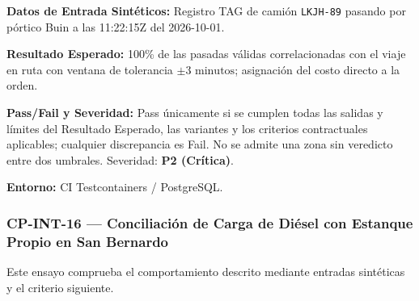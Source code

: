 \par\noindent\textbf{Datos de Entrada Sintéticos:} Registro TAG de camión \texttt{L\allowbreak{}K\allowbreak{}J\allowbreak{}H\allowbreak{}-\allowbreak{}8\allowbreak{}9\allowbreak{}} pasando por pórtico Buin a las 11:22:15Z del 2026-10-01.\par
\par\noindent\textbf{Resultado Esperado:} 100\% de las pasadas válidas correlacionadas con el viaje en ruta con ventana de tolerancia \(\pm 3\text{ minutos}\); asignación del costo directo a la orden.\par
\par\noindent\textbf{Pass/Fail y Severidad:} Pass únicamente si se cumplen todas las salidas y límites del Resultado Esperado, las variantes y los criterios contractuales aplicables; cualquier discrepancia es Fail. No se admite una zona sin veredicto entre dos umbrales. Severidad: \textbf{P2 (Crítica)}.\par
\par\noindent\textbf{Entorno:} CI Testcontainers / PostgreSQL.\par






\subsubsection*{CP-INT-16 — Conciliación de Carga de Diésel con Estanque Propio en San Bernardo}\label{sec:9-cp-int-16}
Este ensayo comprueba el comportamiento descrito mediante entradas sintéticas y el criterio siguiente.

